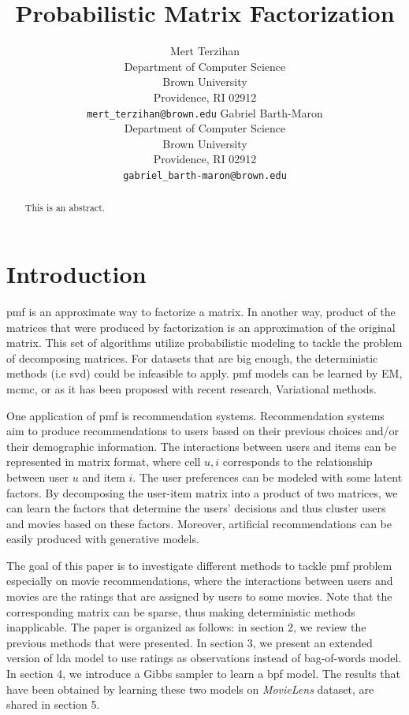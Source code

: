 \documentclass{article} %
\title{Probabilistic Matrix Factorization}
\author{ 
  Mert Terzihan \\
  Department of Computer Science\\
  Brown University\\
  Providence, RI 02912 \\
  \texttt{mert\_terzihan@brown.edu}
  \And
  Gabriel Barth-Maron \\
  Department of Computer Science \\
  Brown University \\
  Providence, RI 02912 \\
  \texttt{gabriel\_barth-maron@brown.edu}\\
}
\begin{document}
\maketitle
\begin{abstract}
This is an abstract.
\end{abstract}

\section{Introduction}
\Gls{pmf} is an approximate way to factorize a matrix. In another way, product 
of the matrices that were produced by factorization is an approximation of the 
original matrix. This set of algorithms utilize probabilistic modeling to tackle 
the problem of decomposing matrices. For datasets that are big enough, the 
deterministic methods (i.e \Gls{svd}) could be infeasible to apply. \Gls{pmf} 
models can be learned by EM, \Gls{mcmc}, or as it has been proposed with recent 
research, Variational methods. 

One application of \Gls{pmf} is recommendation systems. Recommendation systems 
aim to produce recommendations to users based on their previous choices and/or 
their demographic information. The interactions between users and items can be 
represented in matrix format, where cell $u,i$ corresponds to the relationship 
between user $u$ and item $i$. The user preferences can be modeled with some 
latent factors. By decomposing the user-item matrix into a product of two 
matrices, we can learn the factors that determine the users' decisions and thus 
cluster users and movies based on these factors. Moreover, artificial 
recommendations can be easily produced with generative models. 

The goal of this paper is to investigate different methods to tackle \Gls{pmf} 
problem especially on movie recommendations, where the interactions between 
users and movies are the ratings that are assigned by users to some movies. Note 
that the corresponding matrix can be sparse, thus making deterministic methods 
inapplicable. The paper is organized as follows: in section 2, we review the 
previous methods that were presented. In section 3, we present an extended 
version of \Gls{lda} model to use ratings as observations instead of bag-of-words 
model. In section 4, we introduce a Gibbs sampler to learn a \Gls{bpf} model. 
The results that have been obtained by learning these two models on 
\textit{MovieLens} dataset, are shared in section 5.
\end{document}
